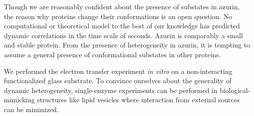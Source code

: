 Though we are reasonably confident about the presence of substates in azurin, the reason why proteins change their conformations is an open question. No computational or theoretical model to the best of our knowledge has predicted dynamic correlations in the time scale of seconds. Azurin is comparably a small and stable protein. From the presence of heterogeneity in azurin, it is tempting to assume a general presence of conformational substates in other proteins.

We performed the electron transfer experiment \textit{in vitro} on a non-interacting functionalized glass substrate. To convince ourselves about the generality of dynamic heterogeneity, single-enzyme experiments can be performed in biological-mimicking structures like lipid vesicles where interaction from external sources can be minimized.